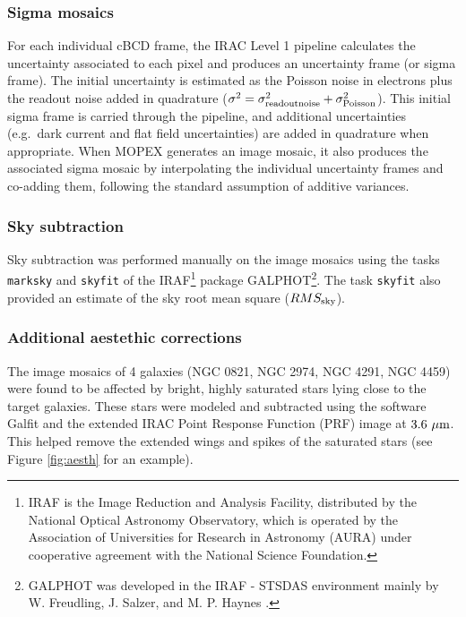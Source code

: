 \documentclass[preprint2]{emulateapj}
\begin{document}
\subsubsection{Sigma mosaics}
For each individual cBCD frame, the IRAC Level 1 pipeline calculates the uncertainty associated to each pixel
and produces an uncertainty frame (or sigma frame).
The initial uncertainty is estimated as the Poisson noise in electrons plus the readout noise added in quadrature
($\sigma^2 = \sigma^2_{\rm readoutnoise} + \sigma^2_{\rm Poisson}$).
This initial sigma frame is carried through the pipeline, and additional uncertainties (e.g.~dark current and flat field uncertainties) 
are added in quadrature when appropriate.
When MOPEX generates an image mosaic, it also produces the associated sigma mosaic 
by interpolating the individual uncertainty frames and co-adding them,
following the standard assumption of additive variances. 

\subsubsection{Sky subtraction}
Sky subtraction was performed manually on the image mosaics using the tasks {\tt marksky} and {\tt skyfit} 
of the IRAF\footnote{IRAF is the Image Reduction and Analysis Facility, 
distributed by the National Optical Astronomy Observatory, 
which is operated by the Association of Universities for Research in Astronomy (AURA) 
under cooperative agreement with the National Science Foundation.} 
package GALPHOT\footnote{GALPHOT was developed in the IRAF - STSDAS environment mainly by 
W. Freudling, J. Salzer, and M. P. Haynes \citep{haynes1999galphot}.}.
The task {\tt skyfit} also provided an estimate of the sky root mean square ($RMS_{\rm sky}$).

\subsubsection{Additional aestethic corrections}
\label{sec:aesth}
The image mosaics of 4 galaxies (NGC 0821, NGC 2974, NGC 4291, NGC 4459) were found to be affected 
by bright, highly saturated stars lying close to the target galaxies.
These stars were modeled and subtracted using the software Galfit \citep{peng2010} 
and the extended IRAC Point Response Function (PRF) image at $3.6~\rm \mu m$.
This helped remove the extended wings and spikes of the saturated stars 
(see Figure \ref{fig:aesth} for an example).
\end{document}
